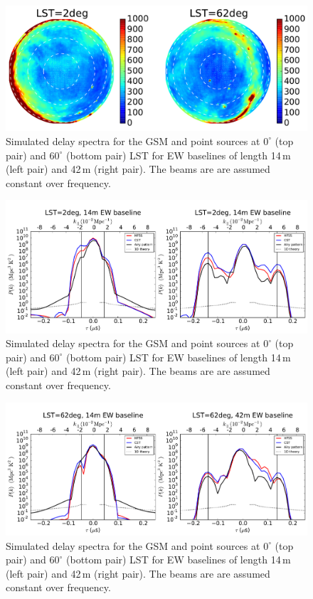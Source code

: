 \documentclass{emulateapj}
\begin{document}
\begin{figure}[h]
\includegraphics[width=6.7in]{gsm_kelvin_LST_2deg_and_62deg.pdf}
\caption{Simulated delay spectra for the GSM and point sources at $0^\circ$ (top pair) and $60^\circ$ (bottom pair) LST for EW baselines of length 14\,m (left pair) and 42\,m (right pair). The beams are are assumed constant over frequency.}
\label{fig:gsmplots}
\end{figure}


\begin{figure}[h]
\includegraphics[width=6.7in]{delay_spectra_dave_rich_airy_beams_LST2deg.pdf}
\caption{Simulated delay spectra for the GSM and point sources at $0^\circ$ (top pair) and $60^\circ$ (bottom pair) LST for EW baselines of length 14\,m (left pair) and 42\,m (right pair). The beams are are assumed constant over frequency.}
\label{fig:delayspecbadLST}
\end{figure}

\begin{figure}[h]
\includegraphics[width=6.7in]{delay_spectra_dave_rich_airy_beams_LST62deg.pdf}
\caption{Simulated delay spectra for the GSM and point sources at $0^\circ$ (top pair) and $60^\circ$ (bottom pair) LST for EW baselines of length 14\,m (left pair) and 42\,m (right pair). The beams are are assumed constant over frequency.}
\label{fig:delayspecgoodLST}
\end{figure}
\end{document}
